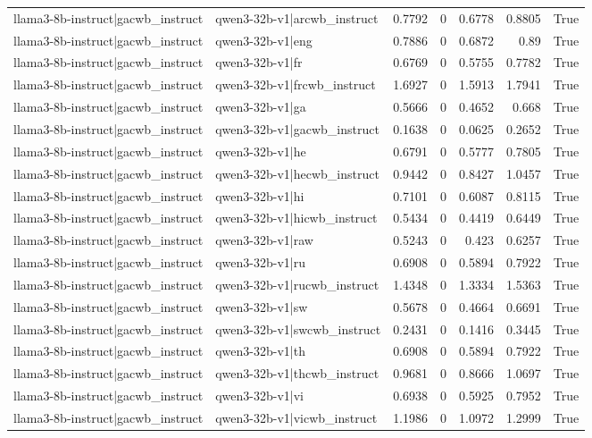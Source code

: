 \begin{table}
\begin{tabular}{l l r r r r l}
llama3-8b-instruct|gacwb_instruct & qwen3-32b-v1|arcwb_instruct & 0.7792 & 0 & 0.6778 & 0.8805 & True \\
llama3-8b-instruct|gacwb_instruct & qwen3-32b-v1|eng & 0.7886 & 0 & 0.6872 & 0.89 & True \\
llama3-8b-instruct|gacwb_instruct & qwen3-32b-v1|fr & 0.6769 & 0 & 0.5755 & 0.7782 & True \\
llama3-8b-instruct|gacwb_instruct & qwen3-32b-v1|frcwb_instruct & 1.6927 & 0 & 1.5913 & 1.7941 & True \\
llama3-8b-instruct|gacwb_instruct & qwen3-32b-v1|ga & 0.5666 & 0 & 0.4652 & 0.668 & True \\
llama3-8b-instruct|gacwb_instruct & qwen3-32b-v1|gacwb_instruct & 0.1638 & 0 & 0.0625 & 0.2652 & True \\
llama3-8b-instruct|gacwb_instruct & qwen3-32b-v1|he & 0.6791 & 0 & 0.5777 & 0.7805 & True \\
llama3-8b-instruct|gacwb_instruct & qwen3-32b-v1|hecwb_instruct & 0.9442 & 0 & 0.8427 & 1.0457 & True \\
llama3-8b-instruct|gacwb_instruct & qwen3-32b-v1|hi & 0.7101 & 0 & 0.6087 & 0.8115 & True \\
llama3-8b-instruct|gacwb_instruct & qwen3-32b-v1|hicwb_instruct & 0.5434 & 0 & 0.4419 & 0.6449 & True \\
llama3-8b-instruct|gacwb_instruct & qwen3-32b-v1|raw & 0.5243 & 0 & 0.423 & 0.6257 & True \\
llama3-8b-instruct|gacwb_instruct & qwen3-32b-v1|ru & 0.6908 & 0 & 0.5894 & 0.7922 & True \\
llama3-8b-instruct|gacwb_instruct & qwen3-32b-v1|rucwb_instruct & 1.4348 & 0 & 1.3334 & 1.5363 & True \\
llama3-8b-instruct|gacwb_instruct & qwen3-32b-v1|sw & 0.5678 & 0 & 0.4664 & 0.6691 & True \\
llama3-8b-instruct|gacwb_instruct & qwen3-32b-v1|swcwb_instruct & 0.2431 & 0 & 0.1416 & 0.3445 & True \\
llama3-8b-instruct|gacwb_instruct & qwen3-32b-v1|th & 0.6908 & 0 & 0.5894 & 0.7922 & True \\
llama3-8b-instruct|gacwb_instruct & qwen3-32b-v1|thcwb_instruct & 0.9681 & 0 & 0.8666 & 1.0697 & True \\
llama3-8b-instruct|gacwb_instruct & qwen3-32b-v1|vi & 0.6938 & 0 & 0.5925 & 0.7952 & True \\
llama3-8b-instruct|gacwb_instruct & qwen3-32b-v1|vicwb_instruct & 1.1986 & 0 & 1.0972 & 1.2999 & True \\

\end{tabular}
\end{table}
